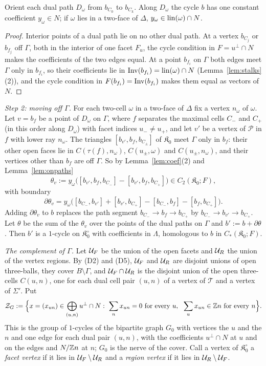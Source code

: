 \begin{lemma}\label{lem:onpaths}
Orient each dual path $D_\omega$ from $b_{C_0}$ to $b_{C_k}$. Along $D_\omega$ the cycle $b$ has one constant coefficient
$y_\omega\in N$; if $\omega$ lies in a two-face of $\Delta$, $y_\omega\in\operatorname{lin}(\omega)\cap N$.
\end{lemma}

\begin{proof}
Interior points of a dual path lie on no other dual path. At a vertex $b_{C_j}$ or $b_{f_j}$ off $\Gamma$, both in the
interior of one facet $F_u$, the cycle condition in $F=u^\perp\cap N$ makes the coefficients of the two edges equal. At a
point $b_{f_i}$ on $\Gamma$ both edges meet $\Gamma$ only in $b_{f_i}$, so their coefficients lie in
$\operatorname{Inv}(b_{f_i})=\operatorname{lin}(\omega)\cap N$ (Lemma~\ref{lem:stalks}(2)), and the cycle condition in $F(b_{f_i})=\operatorname{Inv}(b_{f_i})$
makes them equal as vectors of $N$.
\end{proof}

\emph{Step 2: moving off $\Gamma$.} For each two-cell $\omega$ in a two-face of $\Delta$ fix a vertex $n_\omega$ of $\omega$.
Let $v=b_f$ be a point of $D_\omega$ on $\Gamma$, where $f$ separates the maximal cells $C_-$ and $C_+$ (in this order along
$D_\omega$) with facet indices $u_-\ne u_+$, and let $v'$ be a vertex of $\mathscr P$ in $f$ with lower ray $n_\omega$.
The triangles $[b_{v'},b_f,b_{C_\pm}]$ of $\mathfrak K_0$ meet $\Gamma$ only in $b_f$: their other open faces lie in
$C(\tau(f),n_\omega)$, $C(u_\pm,\omega)$ and $C(u_\pm,n_\omega)$, and their vertices other than $b_f$ are off $\Gamma$. So by Lemma~\ref{lem:coef}(2) and
Lemma~\ref{lem:onpaths}
\[
\theta_v:=y_\omega\bigl([b_{v'},b_f,b_{C_-}]-[b_{v'},b_f,b_{C_+}]\bigr)\in C_2(\mathfrak K_0;F),
\]
with boundary
\[
\partial \theta_v=y_\omega\bigl([b_{C_-},b_{v'}]+[b_{v'},b_{C_+}]-[b_{C_-},b_f]-[b_f,b_{C_+}]\bigr).
\]
Adding $\partial \theta_v$ to $b$ replaces the path segment $b_{C_-}\to b_f\to b_{C_+}$ by $b_{C_-}\to b_{v'}\to b_{C_+}$. Let $\theta$ be
the sum of the $\theta_v$ over the points of the dual paths on $\Gamma$ and $b':=b+\partial \theta$. Then $b'$ is a $1$-cycle on
$\mathfrak K_0^\circ$ with coefficients in $\Lambda$, homologous to $b$ in $C_*(\mathfrak K_0;F)$.

\emph{The complement of $\Gamma$.} Let $\mathcal U_F$ be the union of the open facets and $\mathcal U_R$ the union of the vertex
regions. By (D2) and (D5), $\mathcal U_F$ and $\mathcal U_R$ are disjoint unions of open three-balls, they cover $B\setminus\Gamma$,
and $\mathcal U_F\cap\mathcal U_R$ is the disjoint union of the open three-cells $C(u,n)$, one for each dual cell pair $(u,n)$ of a vertex
of $\mathcal T$ and a vertex of $\Sigma'$. Put
\[
\mathcal Z_G:=\Bigl\{x=(x_{un})\in\bigoplus_{(u,n)}u^\perp\cap N:\ \sum_nx_{un}=0\text{ for every }u,\ \ \sum_ux_{un}\in\Z n
\text{ for every }n\Bigr\}.
\]
This is the group of $1$-cycles of the bipartite graph $G_0$ with vertices the $u$ and the $n$ and one edge for each dual
pair $(u,n)$, with the coefficients $u^\perp\cap N$ at $u$ and on the edges and $N/\mathbb Z n$ at $n$; $G_0$ is the nerve of the
cover. Call a vertex of $\mathfrak K_0^\circ$ a \emph{facet vertex} if it lies in $\mathcal U_F\setminus\mathcal U_R$ and a \emph{region vertex} if it
lies in $\mathcal U_R\setminus\mathcal U_F$.

